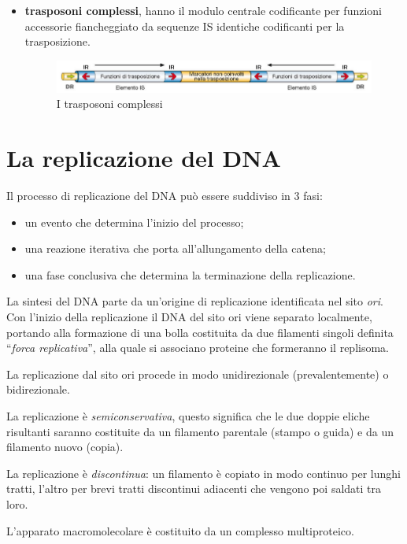 \documentclass[11pt]{book}
\begin{document}
\begin{itemize}
\clearpage
\item \textbf{trasposoni complessi}, hanno il modulo centrale codificante per funzioni accessorie fiancheggiato da sequenze IS identiche codificanti per la trasposizione.

\begin{figure}[htp]
\centering
\includegraphics[scale=0.4]{img/Trasposoni complessi.png}
\caption{I trasposoni complessi}
\label{}
\end{figure}

\end{itemize}


\section{La replicazione del DNA} 
Il processo di replicazione del DNA può essere suddiviso in 3 fasi:
\begin{itemize}
\item un evento che determina l’inizio del processo;
\item una reazione iterativa che porta all’allungamento della catena;
\item una fase conclusiva che determina la terminazione della replicazione.
\end{itemize}

La sintesi del DNA parte da un'origine di replicazione identificata nel sito \emph{ori}. Con l’inizio della replicazione il DNA del sito ori viene separato localmente, portando alla formazione di una bolla costituita da due filamenti singoli definita ``\emph{forca replicativa}'', alla quale si associano proteine che formeranno il replisoma.

La replicazione dal sito ori procede in modo unidirezionale (prevalentemente) o bidirezionale.

La replicazione è \emph{semiconservativa}, questo significa che le due doppie eliche risultanti saranno costituite da un filamento parentale (stampo o guida) e da un filamento nuovo (copia).

La replicazione è \emph{discontinua}: un filamento è copiato in modo continuo per lunghi tratti, l’altro per brevi tratti discontinui adiacenti che vengono poi saldati tra loro.

L’apparato macromolecolare è costituito da un complesso multiproteico.
\end{document}

